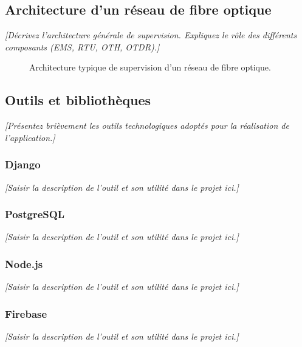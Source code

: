 \documentclass[11pt,a4paper]{article}
\begin{document}
\subsection{Architecture d’un réseau de fibre optique}
\textit{[Décrivez l'architecture générale de supervision. Expliquez le rôle des différents composants (EMS, RTU, OTH, OTDR).]}

\begin{figure}[H]
    \centering
    \caption{Architecture typique de supervision d’un réseau de fibre optique.}
    \label{fig:typical_arch}
\end{figure}

\subsection{Outils et bibliothèques}
\textit{[Présentez brièvement les outils technologiques adoptés pour la réalisation de l'application.]}

\subsubsection{Django}
\textit{[Saisir la description de l'outil et son utilité dans le projet ici.]}

\subsubsection{PostgreSQL}
\textit{[Saisir la description de l'outil et son utilité dans le projet ici.]}

\subsubsection{Node.js}
\textit{[Saisir la description de l'outil et son utilité dans le projet ici.]}

\subsubsection{Firebase}
\textit{[Saisir la description de l'outil et son utilité dans le projet ici.]}
\end{document}
